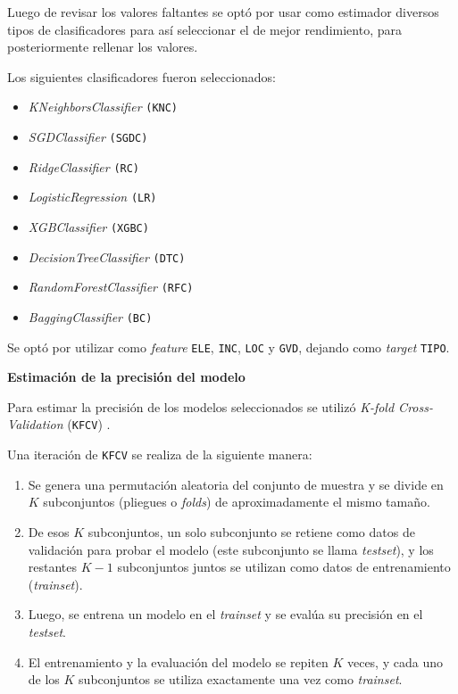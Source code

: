 \documentclass[a4paper,12pt]{article}
\begin{document}
Luego de revisar los valores faltantes se optó por usar como estimador diversos tipos de clasificadores para así seleccionar el de mejor rendimiento, para posteriormente rellenar los valores.

Los siguientes clasificadores fueron seleccionados:

\begin{itemize}
	\item \textit{KNeighborsClassifier} \texttt{(KNC)}
	\item \textit{SGDClassifier} \texttt{(SGDC)}
	\item \textit{RidgeClassifier} \texttt{(RC)}
    \item \textit{LogisticRegression} \texttt{(LR)}
    \item \textit{XGBClassifier} \texttt{(XGBC)}
    \item \textit{DecisionTreeClassifier} \texttt{(DTC)}
    \item \textit{RandomForestClassifier} \texttt{(RFC)}
    \item \textit{BaggingClassifier} \texttt{(BC)}
\end{itemize}

Se optó por utilizar como \textit{feature} \texttt{ELE}, \texttt{INC}, \texttt{LOC} y \texttt{GVD}, dejando como \textit{target} \texttt{TIPO}.

\hfill

\textbf{Estimación de la precisión del modelo}

Para estimar la precisión de los modelos seleccionados se utilizó \textit{K-fold Cross-Validation} (\texttt{KFCV}) \citep{kfolds}.

Una iteración de \texttt{KFCV} se realiza de la siguiente manera: 

\begin{enumerate}
	\item Se genera una permutación aleatoria del conjunto de muestra y se divide en $K$ subconjuntos (pliegues o \textit{folds}) de aproximadamente el mismo tamaño.
	\item De esos $K$ subconjuntos, un solo subconjunto se retiene como datos de validación para probar el modelo (este subconjunto se llama \textit{testset}), y los restantes $K-1$ subconjuntos juntos se utilizan como datos de entrenamiento (\textit{trainset}).
	\item Luego, se entrena un modelo en el \textit{trainset} y se evalúa su precisión en el \textit{testset}. 
	\item El entrenamiento y la evaluación del modelo se repiten $K$ veces, y cada uno de los $K$ subconjuntos se utiliza exactamente una vez como \textit{trainset}.
\end{enumerate}
\end{document}

